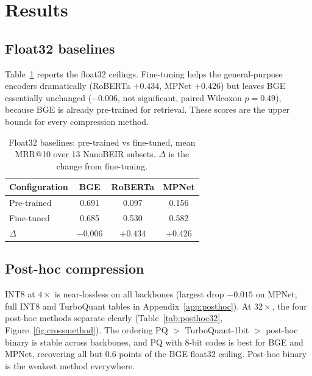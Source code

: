 \section{Results}
\label{sec:results}

\subsection{Float32 baselines}
\label{subsec:baselines}
Table~\ref{tab:baselines} reports the float32 ceilings. Fine-tuning helps the
general-purpose encoders dramatically (RoBERTa $+0.434$, MPNet $+0.426$) but
leaves BGE essentially unchanged ($-0.006$, not significant, paired Wilcoxon
$p=0.49$), because BGE is already pre-trained for retrieval. These scores are
the upper bounds for every compression method.

\begin{table}[t]
  \centering
  \caption{Float32 baselines: pre-trained vs fine-tuned, mean MRR@10 over 13
  NanoBEIR subsets. $\Delta$ is the change from fine-tuning.}
  \label{tab:baselines}
  \begin{tabular}{lccc}
    \toprule
    \textbf{Configuration} & \textbf{BGE} & \textbf{RoBERTa} & \textbf{MPNet} \\
    \midrule
    Pre-trained  & 0.691 & 0.097 & 0.156 \\
    Fine-tuned   & 0.685 & 0.530 & 0.582 \\
    $\Delta$     & $-0.006$ & $+0.434$ & $+0.426$ \\
    \bottomrule
  \end{tabular}
\end{table}

\subsection{Post-hoc compression}
\label{subsec:posthoc}
INT8 at $4\times$ is near-lossless on all backbones (largest drop $-0.015$ on
MPNet; full INT8 and TurboQuant tables in Appendix~\ref{app:posthoc}). At
$32\times$, the four post-hoc methods separate clearly
(Table~\ref{tab:posthoc32}, Figure~\ref{fig:crossmethod}). The ordering
PQ $>$ TurboQuant-1bit $>$ post-hoc binary is stable across backbones, and PQ
with $8$-bit codes is best for BGE and MPNet, recovering all but $0.6$ points of
the BGE float32 ceiling. Post-hoc binary is the weakest method everywhere.

